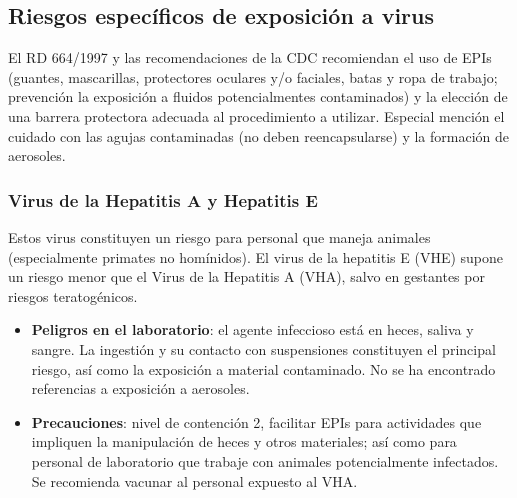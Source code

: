 \subsection{Riesgos específicos de exposición a virus}
El RD 664/1997 y las recomendaciones de la CDC recomiendan el uso de EPIs (guantes, mascarillas, protectores oculares y/o faciales, batas y ropa de trabajo; prevención la exposición a fluidos potencialmentes contaminados) y la elección de una barrera protectora adecuada al procedimiento a utilizar. Especial mención el cuidado con las agujas contaminadas (no deben reencapsularse) y la formación de aerosoles.
\subsubsection{Virus de la Hepatitis A y Hepatitis E}
Estos virus constituyen un riesgo para personal que maneja animales (especialmente primates no homínidos). El virus de la hepatitis E (VHE) supone un riesgo menor que el Virus de la Hepatitis A (VHA), salvo en gestantes por riesgos teratogénicos.
\begin{itemize}[itemsep=0pt,parsep=0pt,topsep=0pt,partopsep=0pt]
    \item \textbf{Peligros en el laboratorio}: el agente infeccioso está en heces, saliva y sangre. La ingestión y su contacto con suspensiones constituyen el principal riesgo, así como la exposición a material contaminado. No se ha encontrado referencias a exposición a aerosoles. 
    \item \textbf{Precauciones}: nivel de contención 2, facilitar EPIs para actividades que impliquen la manipulación de heces y otros materiales; así como para personal de laboratorio que trabaje con animales potencialmente infectados. Se recomienda vacunar al personal expuesto al VHA.
\end{itemize}
